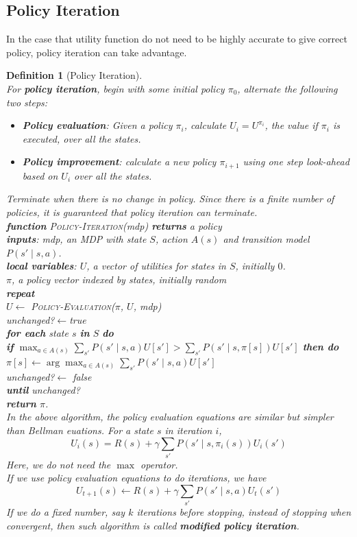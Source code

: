 \documentclass[12pt]{article}
\newcommand{\ind}{\hspace*{15pt}}
\newtheorem{definition}{Definition}[section]
\theoremstyle{definition}
\begin{document}
\subsection{Policy Iteration}
In the case that utility function do not need to be highly accurate to give correct policy, policy iteration can take advantage.
\begin{definition}[Policy Iteration]
\hfill\\\normalfont For \textbf{policy iteration}, begin with some initial policy $\pi_0$, alternate the following two steps:
\begin{itemize}
	\item \textbf{Policy evaluation}: Given a policy $\pi_i$, calculate $U_i=U^{\pi_i}$, the value if $\pi_i$ is executed, over all the states.
	\item \textbf{Policy improvement}: calculate a new policy $\pi_{i+1}$ using one step look-ahead based on $U_i$ over all the states.
\end{itemize}
Terminate when there is no change in policy. Since there is a finite number of policies, it is guaranteed that policy iteration can terminate.\\

\textbf{function} \textsc{Policy-Iteration}(\textit{mdp}) \textbf{returns} a policy\\
\ind \textbf{inputs}: \textit{mdp}, an MDP with state $S$, action $A(s)$ and transition model $P(s'\mid s,a)$.\\
\ind \textbf{local variables}: $U$, a vector of utilities for states in $S$, initially $0$.\\
\ind \ind\ind\ind\ind\ind\ind $\pi$, a policy vector indexed by states, initially random\\
\ind \textbf{repeat}\\
\ind\ind $U\leftarrow$ \textsc{Policy-Evaluation}($\pi$, $U$, \textit{mdp})\\
\ind\ind\textit{unchanged?}$\leftarrow$true\\
\ind\ind\textbf{for each} state $s$ \textbf{in} $S$ \textbf{do}\\
\ind\ind\ind\textbf{if} $\max_{a\in A(s)}\sum_{s'}P(s'\mid s,a)U[s']>\sum_{s'}P(s'\mid s, \pi[s])U[s']$ \textbf{then do}\\
\ind\ind\ind\ind $\pi[s]\leftarrow\arg\max_{a\in A(s)}\sum_{s'}P(s'\mid s,a)U[s']$\\
\ind\ind\ind\ind \textit{unchanged?}$\leftarrow$ false\\
\ind\textbf{until} \textit{unchanged?}\\
\ind\textbf{return} $\pi$.\\

In the above algorithm, the policy evaluation equations are similar but simpler than Bellman euations. For a state $s$ in iteration $i$,
\[
U_i(s) = R(s)+\gamma\sum_{s'}P(s'\mid s, \pi_i(s))U_i(s')
\]
Here, we do not need the $\max$ operator.\\
If we use policy evaluation equations to do iterations, we have
\[
U_{t+1}(s)\leftarrow R(s)+\gamma\sum_{s'}P(s'\mid s,a)U_t(s')
\]
If we do a fixed number, say $k$ iterations before stopping, instead of stopping when convergent, then such algorithm is called \textbf{modified policy iteration}.
\end{definition}
\end{document}
